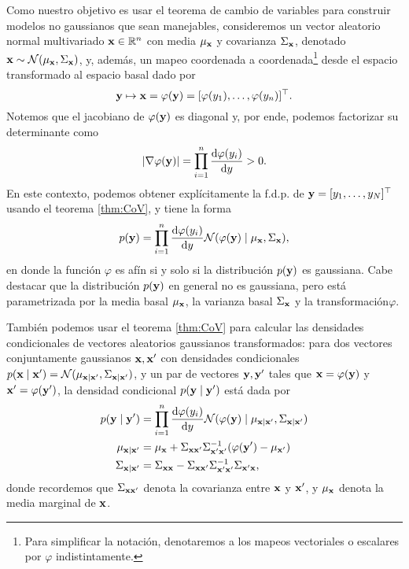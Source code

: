 Como nuestro objetivo es usar el teorema de cambio de variables para construir modelos no gaussianos que sean manejables, consideremos un vector aleatorio normal multivariado \(\mathbf{x} \in \mathbb{R}^n\) con media \(\mu_{\mathbf{x}}\) y covarianza \(\Sigma_{\mathbf{x}}\), denotado \(\mathbf{x} \sim \mathcal{N}(\mu_{\mathbf{x}}, \Sigma_{\mathbf{x}})\), y, además, un mapeo coordenada a coordenada\footnote{Para simplificar la notación, denotaremos a los mapeos vectoriales o escalares por \(\varphi\) indistintamente.} desde el espacio transformado al espacio basal dado por
\begin{equation*}
	\mathbf{y} \mapsto \mathbf{x} = \varphi(\mathbf{y}) = [\varphi(y_{1}), \dotsc, \varphi(y_{n})]^\top.
\end{equation*}
Notemos que el jacobiano de \(\varphi(\mathbf{y})\) es diagonal y, por ende, podemos factorizar su determinante como
\begin{equation*}
	\vert \nabla \varphi(\mathbf{y}) \vert = \prod_{i=1}^{n} \dv{\varphi(y_{i})}{y} > 0.
\end{equation*}
En este contexto, podemos obtener explícitamente la f.d.p. de \(\mathbf{y} = [y_1, \dotsc, y_N]^\top\) usando el teorema \ref{thm:CoV}, y tiene la forma
\begin{equation*}
	p(\mathbf{y}) = \prod_{i=1}^{n} \dv{\varphi(y_{i})}{y} \mathcal{N}(\varphi(\mathbf{y}) \mid \mu_{\mathbf{x}}, \Sigma_{\mathbf{x}}),
\end{equation*}
en donde la función \(\varphi\) es afín si y solo si la distribución \(p(\mathbf{y})\) es gaussiana. Cabe destacar que la distribución \(p(\mathbf{y})\) en general no es gaussiana, pero está parametrizada por la media basal \(\mu_{\mathbf{x}}\), la varianza basal \(\Sigma_{\mathbf{x}}\) y la transformación\(\varphi\).

También podemos usar el teorema \ref{thm:CoV} para calcular las densidades condicionales de vectores aleatorios gaussianos transformados: para dos vectores conjuntamente gaussianos \(\mathbf{x}, \mathbf{x}'\) con densidades condicionales \(p(\mathbf{x} \mid \mathbf{x}') = \mathcal{N}(\mu_{\mathbf{x} \mid \mathbf{x}'}, \Sigma_{\mathbf{x} \mid \mathbf{x}'})\), y un par de vectores \(\mathbf{y}, \mathbf{y}'\) tales que \(\mathbf{x} = \varphi(\mathbf{y})\) y \(\mathbf{x}' = \varphi(\mathbf{y}')\), la densidad condicional \(p(\mathbf{y} \mid \mathbf{y}')\) está dada por
\begin{align*}
	p(\mathbf{y} \mid \mathbf{y}')			&= \prod_{i=1}^{n} \dv{\varphi(y_{i})}{y} \mathcal{N}(\varphi(\mathbf{y}) \mid \mu_{\mathbf{x} \mid \mathbf{x}'}, \Sigma_{\mathbf{x} \mid \mathbf{x}'})\\
	\mu_{\mathbf{x} \mid \mathbf{x}'}		&= \mu_{\mathbf{x}} + \Sigma_{\mathbf{x} \mathbf{x}'} \Sigma_{\mathbf{x}' \mathbf{x}'}^{-1} (\varphi(\mathbf{y}') - \mu_{\mathbf{x}'})\\
	\Sigma_{\mathbf{x} \mid \mathbf{x}'}	&= \Sigma_{\mathbf{x} \mathbf{x}} - \Sigma_{\mathbf{x} \mathbf{x}'} \Sigma_{\mathbf{x}' \mathbf{x}'}^{-1} \Sigma_{\mathbf{x}' \mathbf{x}},
\end{align*}
donde recordemos que \(\Sigma_{\mathbf{x} \mathbf{x}'}\) denota la covarianza entre \(\mathbf{x}\) y \(\mathbf{x}'\), y \(\mu_{\mathbf{x}}\) denota la media marginal de \(\mathbf{x}\).

